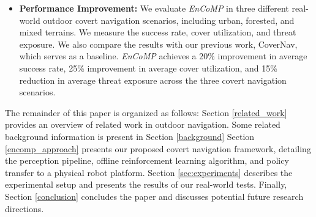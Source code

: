 \begin{itemize}
 \item \textbf{Performance Improvement:}
  We evaluate \textit{EnCoMP} in three different real-world outdoor covert navigation scenarios, including urban, forested, and mixed terrains. We measure the success rate, cover utilization, and threat exposure. We also compare the results with our previous work, CoverNav, which serves as a baseline. \textit{EnCoMP} achieves a 20\% improvement in average success rate, 25\% improvement in average cover utilization, and 15\% reduction in average threat exposure across the three covert navigation scenarios.
\end{itemize}

\vspace{1mm}

The remainder of this paper is organized as follows: Section \ref{related_work} provides an overview of related work in outdoor navigation. Some related background information is present in Section \ref{background} Section \ref{encomp_approach} presents our proposed covert navigation framework, detailing the perception pipeline, offline reinforcement learning algorithm, and policy transfer to a physical robot platform. Section \ref{sec:experiments} describes the experimental setup and presents the results of our real-world tests. Finally, Section \ref{conclusion} concludes the paper and discusses potential future research directions.